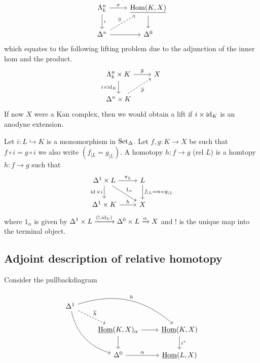 \[
    \begin{tikzcd}
        \Lambda_k^n
        \ar[r,"\sigma"]
        \ar[d,"\iota"]
        &
        \underline{\Hom(K,X)}
        \ar[d]
        \\
        \Delta^n
        \ar[ur, dashed, "\exists"]
        \ar[r]
        &
        \Delta^0
    \end{tikzcd}
\]
which equates to the following lifting problem due to the adjunction of the inner hom and the product.
\[
\begin{tikzcd}
    \Lambda^n_k \times K
    \ar[r, " \overline{\sigma} "]
    \ar[d, " i \times \id_K"' ]
    &
    X
    \\
    \Delta^n \times K
    \ar[ru, dashed, " \overline{ \rho }"']
\end{tikzcd}
\]
If now $X$ were a Kan complex, then we would obtain a lift if $ i \times \operatorname{id}_K $ is an anodyne extension.

\begin{defi}
    Let $i\colon L \hookrightarrow K$ is a monomorphism in $\operatorname{Set}_{\Delta}$.
    Let $f,g \colon K \to X$ be such that $f \circ i = g \circ i$ we also write $(f_{\mid L}=g_{\mid L})$. A homotopy $h\colon f \to g $ (rel $L$) is a homtopy $h \colon f \to g$ such that 
    \[
    \begin{tikzcd}
        \Delta^1 \times L 
        \ar[r, "\pi_L"]
        \ar[dr,"1_{\alpha}"]
        \ar[d, "\id \times i"']
        &
        L
        \ar[d, "f_{\mid L} = \alpha = g_{\mid L}"]
        \\
        \Delta^1 \times K 
        \ar[r, "h"]
        &
        X
    \end{tikzcd}
    \]
    where $1_{\alpha}$ is given by $\Delta^1 \times L \xrightarrow{(!,\operatorname{id}_L)} \Delta^0 \times L \xrightarrow{\alpha}X$ and $!$ is the unique map into the terminal object.
\end{defi}

\subsection{Adjoint description of relative homotopy}

Consider the pullbackdiagram

\[
\begin{tikzcd}
    \Delta^1
    \ar[rd, dashed, "\overline{h}"]
    \ar[rrd,bend left,"h"]
    \ar[ddr, bend right]
    \\
    &
    \underline{\Hom}(K,X)_{\alpha}
    \ar[r]
    \ar[d]
    &
    \underline{\Hom}(K,X)
    \ar[d,"i^*"]
    \\
    &
    \Delta^0
    \ar[r,"\alpha"]
    &
    \underline{\Hom}(L,X)
\end{tikzcd}
\]

